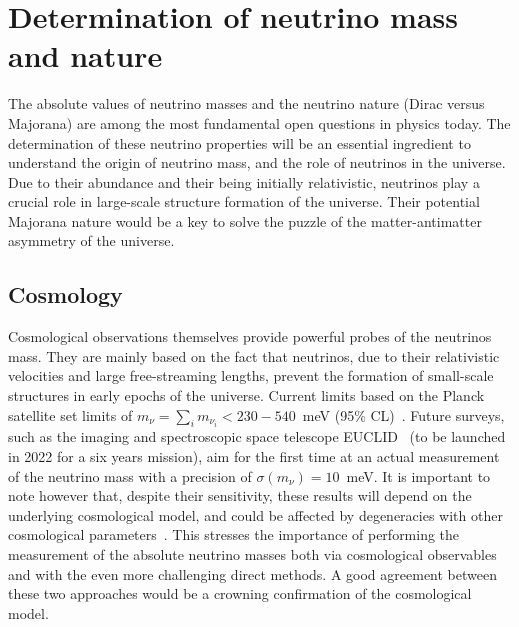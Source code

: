 

\section{Determination of neutrino mass and nature}

The absolute values of neutrino masses and the neutrino nature (Dirac versus Majorana) are among the most fundamental open questions in physics today. The determination of these neutrino properties will be an essential ingredient to understand the origin of neutrino mass, and the role of neutrinos in the universe. Due to their abundance and their being initially relativistic, neutrinos play a crucial role in large-scale structure formation of the universe. Their potential Majorana nature would be a key to solve the puzzle of the matter-antimatter asymmetry of the universe. 

\subsection{Cosmology}
Cosmological observations themselves provide powerful probes of the neutrinos mass. They are mainly based on the fact that neutrinos, due to their relativistic velocities and large free-streaming lengths, prevent the formation of small-scale structures in early epochs of the universe. Current limits based on the Planck satellite set limits of $m_{\nu} = \sum_i m_{\nu_i}<230 - 540$~meV (95\% CL)~\cite{Aghanim:2018eyx}. Future surveys, such as the imaging and spectroscopic space telescope EUCLID~\cite{Laureijs:2011gra} (to be launched in 2022 for a six years mission), aim for the first time at an actual measurement of the neutrino mass with a precision of $\sigma({m_{\nu} }) = 10$~meV. %
It is important to note however that, despite their sensitivity, these results will depend on the underlying cosmological model, and could be affected by degeneracies with other cosmological parameters~\cite{Boyle:2017lzt, Boyle:2018rva}.  This stresses the importance of performing the measurement of the absolute neutrino masses both via cosmological observables and with the even more challenging direct methods. A good agreement between these two approaches would be a crowning confirmation of the cosmological model.


